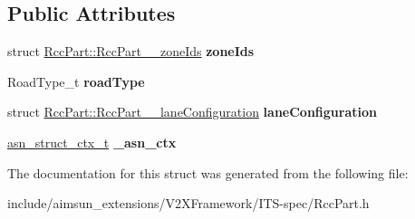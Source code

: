 \subsection*{Public Attributes}
\begin{DoxyCompactItemize}
\item 
struct \hyperlink{structRccPart_1_1RccPart____zoneIds}{Rcc\+Part\+::\+Rcc\+Part\+\_\+\+\_\+zone\+Ids} {\bfseries zone\+Ids}\hypertarget{structRccPart_ac1049a90f86aff4f49656b9e354c2ca5}{}\label{structRccPart_ac1049a90f86aff4f49656b9e354c2ca5}

\item 
Road\+Type\+\_\+t {\bfseries road\+Type}\hypertarget{structRccPart_abf6228fce1cc413deb74e89fa5020396}{}\label{structRccPart_abf6228fce1cc413deb74e89fa5020396}

\item 
struct \hyperlink{structRccPart_1_1RccPart____laneConfiguration}{Rcc\+Part\+::\+Rcc\+Part\+\_\+\+\_\+lane\+Configuration} {\bfseries lane\+Configuration}\hypertarget{structRccPart_afd4dc6463090690b423a917b2b1e7e2e}{}\label{structRccPart_afd4dc6463090690b423a917b2b1e7e2e}

\item 
\hyperlink{structasn__struct__ctx__s}{asn\+\_\+struct\+\_\+ctx\+\_\+t} {\bfseries \+\_\+asn\+\_\+ctx}\hypertarget{structRccPart_a5f2cf6744f70ce15c118fa8f32d82d47}{}\label{structRccPart_a5f2cf6744f70ce15c118fa8f32d82d47}

\end{DoxyCompactItemize}


The documentation for this struct was generated from the following file\+:\begin{DoxyCompactItemize}
\item 
include/aimsun\+\_\+extensions/\+V2\+X\+Framework/\+I\+T\+S-\/spec/Rcc\+Part.\+h\end{DoxyCompactItemize}
